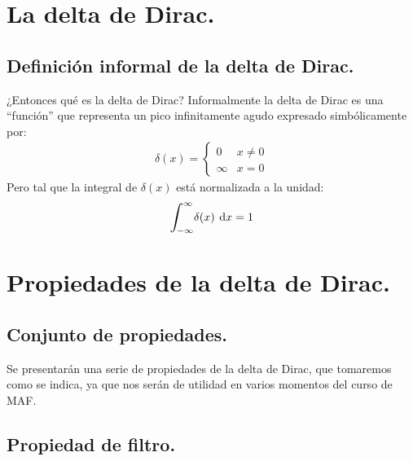 \documentclass[12pt]{article}
\def\scaleint#1{\vcenter{\hbox{\scaleto[3ex]{\displaystyle\int}{#1}}}}
\def\bs{\mkern-12mu}
\numberwithin{equation}{section}
\begin{document}
\section{La delta de Dirac.}
\subsection{Definición informal de la delta de Dirac.}


¿Entonces qué es la delta de Dirac? Informalmente la delta de Dirac es una \enquote{función} que representa un pico infinitamente agudo expresado simbólicamente por:
\begin{align}
\delta (x) = \begin{cases}
0 & x \neq 0 \\
\infty & x = 0
\end{cases}
\label{eq:ecuacion_delta_01}
\end{align}
Pero tal que la integral de $\delta (x)$ está normalizada a la unidad:
\begin{equation}
\scaleint{6ex}_{\bs -\infty}^{\infty} \delta (x) \: \dd{x} = 1 
\label{eq:ecuacion_delta_02}
\end{equation}


\section{Propiedades de la delta de Dirac.}
\subsection{Conjunto de propiedades.}

Se presentarán una serie de propiedades de la delta de Dirac, que tomaremos como se indica, ya que nos serán de utilidad en varios momentos del curso de MAF.

\subsection{Propiedad de filtro.}
\end{document}
